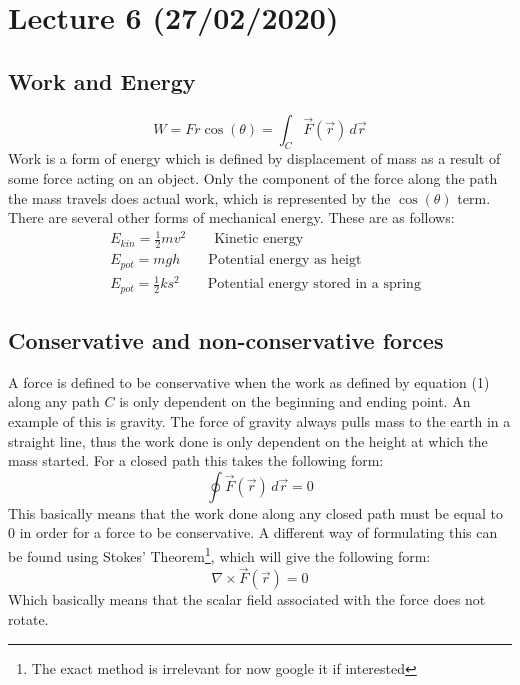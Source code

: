 \documentclass[11pt, a4paper]{article}
\begin{document}
\setcounter{section}{5}

\section{Lecture 6 (27/02/2020)}
\subsection{Work and Energy}
\begin{equation}
  W = Fr\cos(\theta) = \int_{C}\vec{F}(\vec{r})\,d\vec{r}
\end{equation}
Work is a form of energy which is defined by displacement of mass
as a result of some force acting on an object. Only the component of the force
along the path the mass travels does actual work, which is represented by the $\cos(\theta)$ term.
There are several other forms of mechanical energy. These are as follows:
\begin{align}
  &E_{kin} = \frac{1}{2}mv^2 \qquad \text{Kinetic energy}\\
  &E_{pot} = mgh \qquad \text{Potential energy as heigt}\\
  &E_{pot} = \frac{1}{2}ks^2 \qquad \text{Potential energy stored in a spring}
\end{align}

\subsection{Conservative and non-conservative forces}
A force is defined to be conservative when the work as defined by equation (1) along any path
$C$ is only dependent on the beginning and ending point. An example of this is gravity.
The force of gravity always pulls mass to the earth in a straight line, thus the work done is only dependent
on the height at which the mass started. For a closed path this takes the following form:
\begin{equation}
  \oint \vec{F}(\vec{r})\,d\vec{r} = 0
\end{equation}
This basically means that the work done along any closed path must be equal to $0$
in order for a force to be conservative. A different way of formulating this can be found using
Stokes' Theorem\footnote{The exact method is irrelevant for now google it if interested}, which 
will give the following form:
\begin{equation}
  \nabla \times \vec{F}(\vec{r}) = 0
\end{equation}
Which basically means that the scalar field associated with the force does not rotate.
\end{document}
